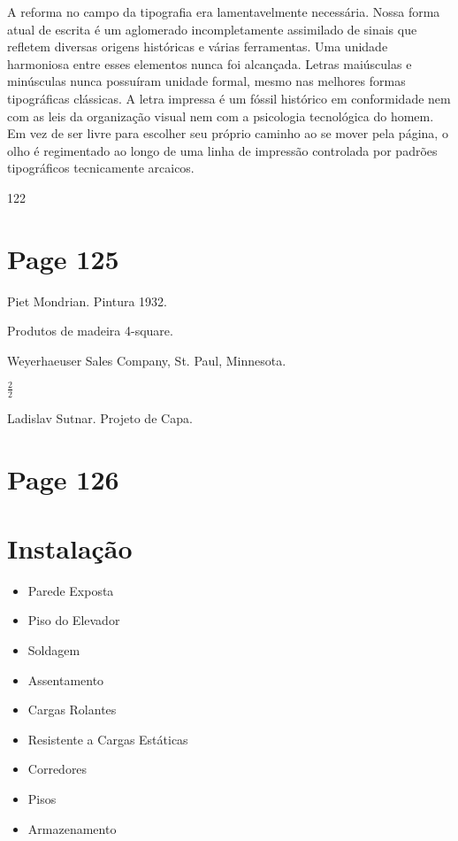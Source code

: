 \documentclass[a4paper]{article}
\begin{document}
A reforma no campo da tipografia era lamentavelmente necessária. Nossa forma atual de escrita é um aglomerado incompletamente assimilado de sinais que refletem diversas origens históricas e várias ferramentas. Uma unidade harmoniosa entre esses elementos nunca foi alcançada. Letras maiúsculas e minúsculas nunca possuíram unidade formal, mesmo nas melhores formas tipográficas clássicas. A letra impressa é um fóssil histórico em conformidade nem com as leis da organização visual nem com a psicologia tecnológica do homem. Em vez de ser livre para escolher seu próprio caminho ao se mover pela página, o olho é regimentado ao longo de uma linha de impressão controlada por padrões tipográficos tecnicamente arcaicos.

\vfill %

122

\newpage
\section*{Page 125}

Piet Mondrian. Pintura 1932.

Produtos de madeira 4-square.

Weyerhaeuser Sales Company, St. Paul, Minnesota.

$\frac{2}{2}$

Ladislav Sutnar. Projeto de Capa.

\newpage
\section*{Page 126}

\section*{Instalação}

\begin{itemize}
    \item Parede Exposta
    \item Piso do Elevador
    \item Soldagem
    \item Assentamento
    \item Cargas Rolantes
    \item Resistente a Cargas Estáticas
    \item Corredores
    \item Pisos
    \item Armazenamento
\end{itemize}
\end{document}

